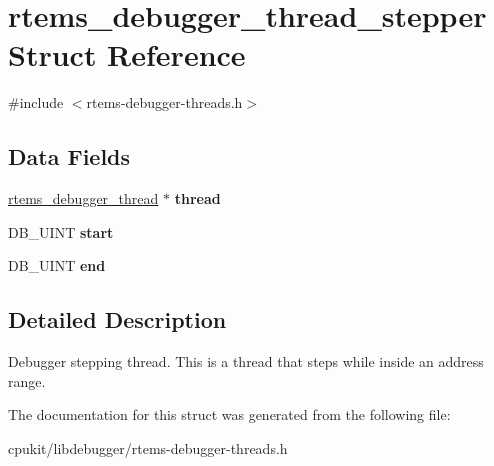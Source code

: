 \hypertarget{structrtems__debugger__thread__stepper}{}\section{rtems\+\_\+debugger\+\_\+thread\+\_\+stepper Struct Reference}
\label{structrtems__debugger__thread__stepper}


{\ttfamily \#include $<$rtems-\/debugger-\/threads.\+h$>$}

\subsection*{Data Fields}
\begin{DoxyCompactItemize}
\item 
\mbox{\label{structrtems__debugger__thread__stepper_aa4253762c4f2ecc3c3595dc410ef7d8c}} 
\mbox{\hyperlink{structrtems__debugger__thread}{rtems\+\_\+debugger\+\_\+thread}} $\ast$ {\bfseries thread}
\item 
\mbox{\label{structrtems__debugger__thread__stepper_a1387b08b173bdf15c22b5e7600b3e4d9}} 
D\+B\+\_\+\+U\+I\+NT {\bfseries start}
\item 
\mbox{\label{structrtems__debugger__thread__stepper_affd2bfa03185d9072c31e412ffa98b38}} 
D\+B\+\_\+\+U\+I\+NT {\bfseries end}
\end{DoxyCompactItemize}


\subsection{Detailed Description}
Debugger stepping thread. This is a thread that steps while inside an address range. 

The documentation for this struct was generated from the following file\+:\begin{DoxyCompactItemize}
\item 
cpukit/libdebugger/rtems-\/debugger-\/threads.\+h\end{DoxyCompactItemize}
